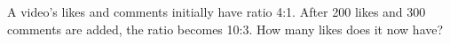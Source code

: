 A video's likes and comments initially have ratio 4:1. After 200 likes and 300 comments are added, the ratio becomes 10:3. How many likes does it now have?
